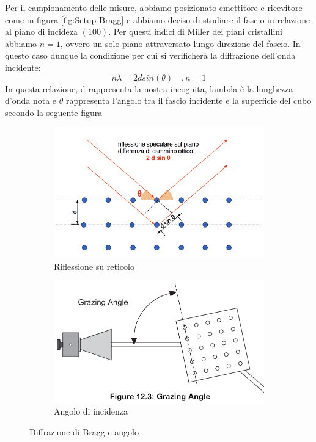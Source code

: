 \documentclass[letterpaper,12pt]{article}
\begin{document}
Per il campionamento delle misure, abbiamo posizionato emettitore e ricevitore come in figura \ref{fig:Setup Bragg}
e abbiamo deciso di studiare il fascio in relazione al piano di incideza $(100)$. Per questi indici di Miller dei piani cristallini abbiamo $n=1$, ovvero un solo piano attraversato lungo direzione del fascio.
In questo caso dunque la condizione per cui si verificherà la diffrazione dell'onda incidente:
\begin{equation}
	n \lambda = 2dsin(\theta) \quad ,n=1
	\label{eq:Legge Bragg}
\end{equation}
In questa relazione, d rappresenta la nostra incognita, lambda è la lunghezza d'onda nota e $\theta$ rappresenta
l'angolo tra il fascio incidente e la superficie del cubo secondo la seguente figura 
\begin{figure}[h!]
    \centering
    \begin{subfigure}[b]{0.28\textwidth}
        \centering
        \includegraphics[width=\textwidth]{diffrazione_bragg.png}
        \caption{Riflessione su reticolo}
        \label{fig:Reticolo Bragg}
    \end{subfigure}
    \hspace{0.3\textwidth} 
    \begin{subfigure}[b]{0.28\textwidth}
        \centering
        \includegraphics[width=\textwidth]{angolo_bragg.png}
        \caption{Angolo di incidenza}
        \label{fig:Angolo Bragg}
    \end{subfigure}
    \caption{Diffrazione di Bragg e angolo}
    \label{fig:combined_figures}
\end{figure}
\end{document}
